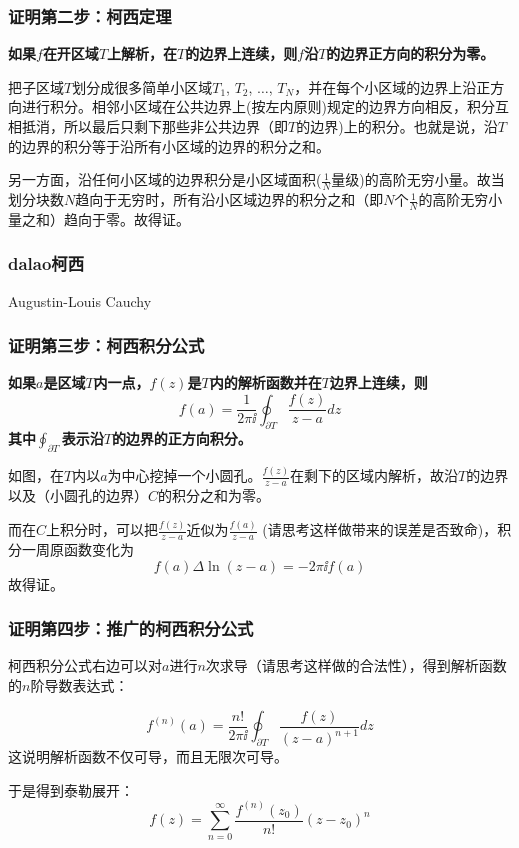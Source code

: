 \documentclass[CJK]{beamer}
\begin{document}
\begin{frame}
  \frametitle{证明第二步：柯西定理} 
  
 {\bf \blue 如果$f$在开区域$T$上解析，在$T$的边界上连续，则$f$沿$T$的边界正方向的积分为零。}

 把子区域$T$划分成很多简单小区域$T_1$, $T_2$, $\ldots$, $T_N$，并在每个小区域的边界上沿正方向进行积分。相邻小区域在公共边界上(按左内原则)规定的边界方向相反，积分互相抵消，所以最后只剩下那些非公共边界（即$T$的边界)上的积分。也就是说，沿$T$的边界的积分等于沿所有小区域的边界的积分之和。

   \emini
   另一方面，沿任何小区域的边界积分是小区域面积($\frac{1}{N}$量级)的高阶无穷小量。故当划分块数$N$趋向于无穷时，所有沿小区域边界的积分之和（即$N$个$\frac{1}{N}$的高阶无穷小量之和）趋向于零。故得证。
   \emini
  
\end{frame}

\begin{frame}
  \frametitle{dalao柯西}
  
  \bcenter

  Augustin-Louis Cauchy
  \ecenter
  
\end{frame}

\begin{frame}
  \frametitle{证明第三步：柯西积分公式} 
  
      {\bf \blue 如果$a$是区域$T$内一点，$f(z)$是$T$内的解析函数并在$T$边界上连续，则
        $$ f(a) = \frac{1}{2\pi \ii}\oint_{\partial T} \frac{f(z)}{z-a} dz $$
        其中$\oint_{\partial T}$表示沿$T$的边界的正方向积分。}

      \emini
      如图，在$T$内以$a$为中心挖掉一个小圆孔。$\frac{f(z)}{z-a}$在剩下的区域内解析，故沿$T$的边界以及（小圆孔的边界）$C$的积分之和为零。

      而在$C$上积分时，可以把$\frac{f(z)}{z-a}$近似为$\frac{f(a)}{z-a}$ (请思考这样做带来的误差是否致命)，积分一周原函数变化为
      $$f(a)\Delta\ln(z-a)  = -2\pi \ii f(a)$$
      故得证。
      \emini
  
\end{frame}

\begin{frame}
  \frametitle{证明第四步：推广的柯西积分公式} 
  
  柯西积分公式右边可以对$a$进行$n$次求导（请思考这样做的合法性），得到解析函数的$n$阶导数表达式：

  {\blue
        $$f^{(n)}(a) = \frac{n!}{2\pi \ii}\oint_{\partial T} \frac{f(z)}{(z-a)^{n+1}} dz$$    
  }
  这说明解析函数不仅可导，而且无限次可导。

  于是得到泰勒展开：
  $$f(z) = \sum_{n=0}^\infty \frac{f^{(n)}(z_0)}{n!} (z-z_0)^n$$
  
\end{frame}
\end{document}

